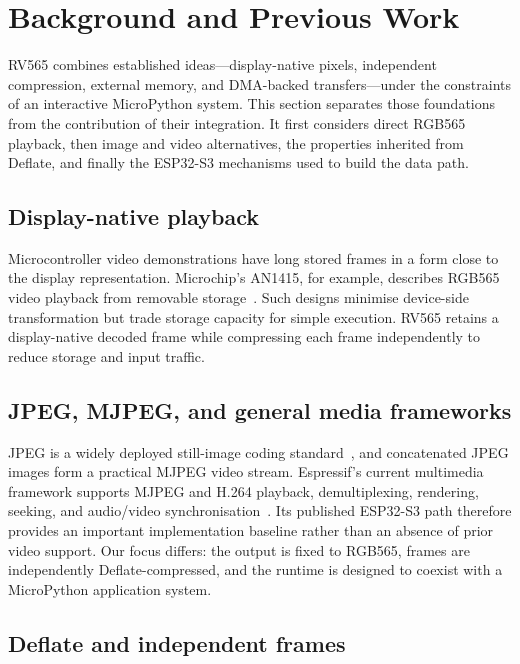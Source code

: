 \documentclass[11pt,twocolumn]{article}
\newcommand{\system}{RV565}
\begin{document}
\section{Background and Previous Work}

RV565 combines established ideas---display-native pixels, independent
compression, external memory, and DMA-backed transfers---under the constraints
of an interactive MicroPython system.  This section separates those foundations
from the contribution of their integration.  It first considers direct RGB565
playback, then image and video alternatives, the properties inherited from
Deflate, and finally the ESP32-S3 mechanisms used to build the data path.

\subsection{Display-native playback}

Microcontroller video demonstrations have long stored frames in a form close
to the display representation.  Microchip's AN1415, for example, describes
RGB565 video playback from removable storage~\cite{microchip2012video}.  Such
designs minimise device-side transformation but trade storage capacity for
simple execution.  \system{} retains a display-native decoded frame while
compressing each frame independently to reduce storage and input traffic.

\subsection{JPEG, MJPEG, and general media frameworks}

JPEG is a widely deployed still-image coding standard~\cite{wallace1991jpeg},
and concatenated JPEG images form a practical MJPEG video stream.  Espressif's
current multimedia framework supports MJPEG and H.264 playback, demultiplexing,
rendering, seeking, and audio/video synchronisation~\cite{espressif2026player}.
Its published ESP32-S3 path therefore provides an important implementation
baseline rather than an absence of prior video support.  Our focus differs:
the output is fixed to RGB565, frames are independently Deflate-compressed,
and the runtime is designed to coexist with a MicroPython application system.

\subsection{Deflate and independent frames}
\end{document}
